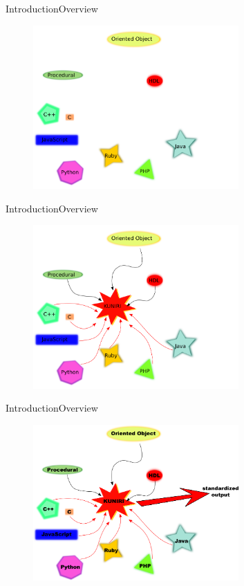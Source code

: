 \documentclass[10pt]{beamer}
\begin{document}
\begin{frame}{Introduction}{Overview}
  \begin{figure}[overview]
    \includegraphics[width=0.7\textwidth]{images/paradigmAndLanguages.png}
  \end{figure}
\end{frame}

\begin{frame}{Introduction}{Overview}
  \begin{figure}[overview]
    \includegraphics[width=0.7\textwidth]{images/paradigmAndLanguagesAndKuniri.png}
  \end{figure}
\end{frame}

\begin{frame}{Introduction}{Overview}
  \begin{figure}[overview]
    \includegraphics[width=0.7\textwidth]{images/overview.png}
  \end{figure}
\end{frame}
\end{document}
